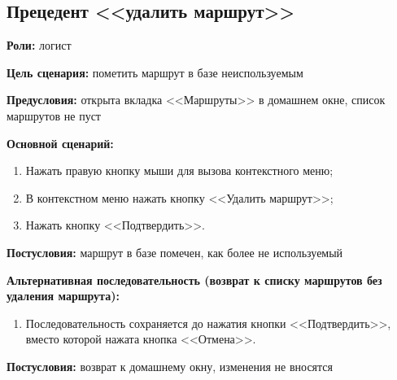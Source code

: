 \subsection{Прецедент <<удалить маршрут>>}
\textbf{Роли:} логист \par
\textbf{Цель сценария:} пометить маршрут в базе неиспользуемым \par
\textbf{Предусловия:} открыта вкладка <<Маршруты>> в домашнем окне,
    список маршрутов не пуст \par
\textbf{Основной сценарий:} 
\begin{enumerate}
    \item Нажать правую кнопку мыши для вызова контекстного меню;
    \item В контекстном меню нажать кнопку <<Удалить маршрут>>;
    \item Нажать кнопку <<Подтвердить>>.
\end{enumerate} \par
\textbf{Постусловия:} маршрут в базе помечен, как более не используемый \par
\textbf{Альтернативная последовательность 
    (возврат к списку маршрутов без удаления маршрута):} \par
\begin{enumerate}
    \item Последовательность сохраняется до нажатия кнопки <<Подтвердить>>, 
        вместо которой нажата кнопка <<Отмена>>.
\end{enumerate} \par
\textbf{Постусловия:} возврат к домашнему окну, изменения не вносятся \par

